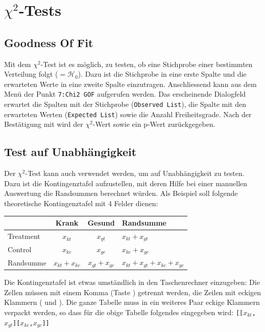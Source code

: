 \documentclass[a4paper,11pt,notitlepage,halfparskip,headsepline,normalheadings,twoside]{scrartcl}
\newlength{\tikey}
\newcommand{\keystroke}[1]{\settowidth{\tikey}{\scriptsize #1}\psframebox[framearc=0.2]{\parbox{\tikey}{\scriptsize\textsf{#1}}}}
\begin{document}
\section{$\chi^2$-Tests}
\subsection{Goodness Of Fit}
Mit dem $\chi^2$-Test ist es möglich, zu testen, ob eine Stichprobe einer
bestimmten Verteilung folgt ($=\mathcal{H}_0$). Dazu ist die Stichprobe in eine
erste Spalte und die erwarteten Werte in eine zweite Spalte einzutragen.
Anschliessend kann aus dem Menü \keystroke{F6} der Punkt \texttt{7:Chi2 GOF}
aufgerufen werden. Das erscheinende Dialogfeld erwartet die Spalten mit der
Stichprobe (\texttt{Observed List}), die Spalte mit den erwarteten Werten
(\texttt{Expected List}) sowie die Anzahl Freiheitsgrade. Nach der Bestätigung
mit \keystroke{ENTER} wird der $\chi^2$-Wert sowie ein p-Wert zurückgegeben.

\subsection{Test auf Unabhängigkeit}
Der $\chi^2$-Test kann auch verwendet werden, um auf Unabhängigkeit zu testen.
Dazu ist die Kontingenztafel aufzustellen, mit deren Hilfe bei einer manuellen
Auswertung die Randsummen berechnet würden. Als Beispiel soll folgende
theoretische Kontingenztafel mit 4 Felder dienen:

\begin{center}\begin{tabular}{l|cc|l}
 & Krank & Gesund & Randsumme\\\toprule
Treatment & $x_{kt}$ & $x_{gt}$ & $x_{kt}+x_{gt}$\\
Control   & $x_{kc} $ & $x_{gc}$ & $x_{kc}+x_{gc}$\\\midrule
Randsumme & $x_{kt}+x_{kc}$ & $x_{gt}+x_{gc}$ & $x_{kt}+x_{gt}+x_{kc}+x_{gc}$\\\bottomrule
\end{tabular}\end{center}

Die Kontingenztafel ist etwas umständlich in den Taschenrechner einzugeben: Die
Zellen müssen mit einem Komma (Taste \keystroke{,}) getrennt werden, die Zeilen
mit eckigen Klammern (\keystroke{[} und \keystroke{]}). Die ganze Tabelle muss in
ein weiteres Paar eckige Klammern verpackt werden, so dass für die obige Tabelle
folgendes eingegeben wird: \texttt{[[$x_{kt}$,$x_{gt}$][$x_{kc}$,$x_{gc}$]]}
\end{document}
